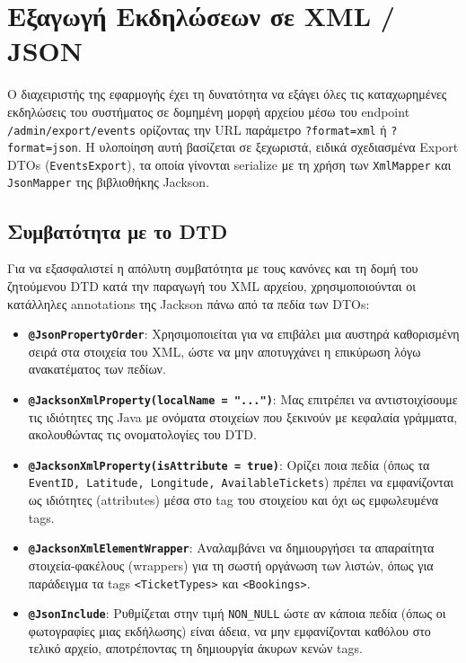 \documentclass[12pt]{fphw}
\newcommand{\en}[1]{\foreignlanguage{english}{#1}}
\begin{document}
\newpage

\section{Εξαγωγή Εκδηλώσεων σε XML / JSON}
Ο διαχειριστής της εφαρμογής έχει τη δυνατότητα να εξάγει όλες τις καταχωρημένες εκδηλώσεις του συστήματος σε δομημένη μορφή αρχείου μέσω του \en{endpoint} \en{\texttt{/admin/export/events}} ορίζοντας την URL παράμετρο \en{\texttt{?format=xml}} ή \en{\texttt{?format=json}}. Η υλοποίηση αυτή βασίζεται σε ξεχωριστά, ειδικά σχεδιασμένα \en{Export DTOs} (\en{\texttt{EventsExport}}), τα οποία γίνονται \en{serialize} με τη χρήση των \en{\texttt{XmlMapper}} και \en{\texttt{JsonMapper}} της βιβλιοθήκης \en{Jackson}.

\subsection{Συμβατότητα με το DTD}
Για να εξασφαλιστεί η απόλυτη συμβατότητα με τους κανόνες και τη δομή του ζητούμενου \en{DTD} κατά την παραγωγή του \en{XML} αρχείου, χρησιμοποιούνται οι κατάλληλες \en{annotations} της \en{Jackson} πάνω από τα πεδία των \en{DTOs}:
\begin{itemize}[leftmargin=*]
    \item \en{\textbf{\texttt{@JsonPropertyOrder}}}: Χρησιμοποιείται για να επιβάλει μια αυστηρά καθορισμένη σειρά στα στοιχεία του \en{XML}, ώστε να μην αποτυγχάνει η επικύρωση λόγω ανακατέματος των πεδίων.
    \item \en{\textbf{\texttt{@JacksonXmlProperty(localName = "...")}}}: Μας επιτρέπει να αντιστοιχίσουμε τις ιδιότητες της \en{Java} με ονόματα στοιχείων που ξεκινούν με κεφαλαία γράμματα, ακολουθώντας τις ονοματολογίες του \en{DTD}.
    \item \en{\textbf{\texttt{@JacksonXmlProperty(isAttribute = true)}}}: Ορίζει ποια πεδία (όπως τα \en{\texttt{EventID, Latitude, Longitude, AvailableTickets}}) πρέπει να εμφανίζονται ως ιδιότητες (\en{attributes}) μέσα στο tag του στοιχείου και όχι ως εμφωλευμένα tags.
    \item \en{\textbf{\texttt{@JacksonXmlElementWrapper}}}: Αναλαμβάνει να δημιουργήσει τα απαραίτητα στοιχεία-φακέλους (\en{wrappers}) για τη σωστή οργάνωση των λιστών, όπως για παράδειγμα τα tags \en{\texttt{<TicketTypes>}} και \en{\texttt{<Bookings>}}.
    \item \en{\textbf{\texttt{@JsonInclude}}}: Ρυθμίζεται στην τιμή \en{\texttt{NON\_NULL}} ώστε αν κάποια πεδία (όπως οι φωτογραφίες μιας εκδήλωσης) είναι άδεια, να μην εμφανίζονται καθόλου στο τελικό αρχείο, αποτρέποντας τη δημιουργία άκυρων κενών tags.
\end{itemize}
\end{document}
